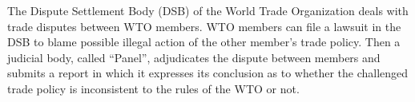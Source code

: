 The Dispute Settlement Body (DSB) of the World Trade Organization deals with trade disputes between WTO members.
WTO members can file a lawsuit in the DSB to blame possible illegal action of the other member's trade policy.
Then a judicial body, called ``Panel'', adjudicates the dispute between members and submits a report in which it expresses
its conclusion as to whether the challenged trade policy is inconsistent to the rules of the WTO or not.
 
 

